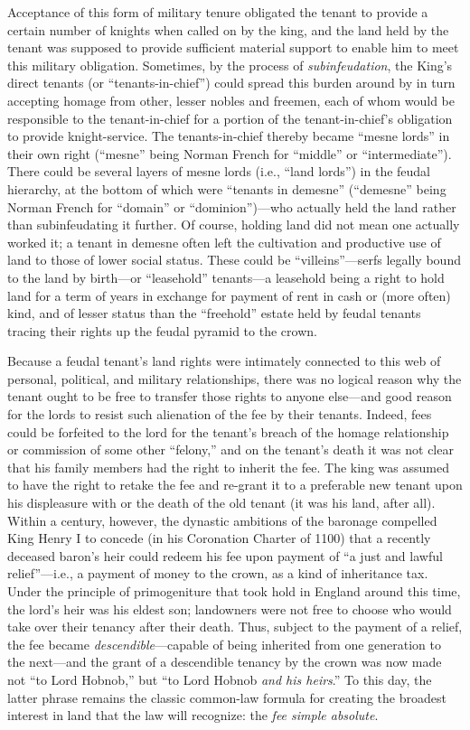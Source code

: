 Acceptance of this form of military tenure obligated the tenant to provide a
certain number of knights when called on by the king, and the land held by the
tenant was supposed to provide sufficient material support to enable him to
meet this military obligation. Sometimes, by the process of
\textit{subinfeudation}, the King's direct tenants (or ``tenants-in-chief'')
could spread this burden around by in turn accepting homage from other, lesser
nobles and freemen, each of whom would be responsible to the tenant-in-chief
for a portion of the tenant-in-chief's obligation to provide knight-service.
The tenants-in-chief thereby became ``mesne lords'' in their own right
(``mesne'' being Norman French for ``middle'' or ``intermediate''). There could
be several layers of mesne lords (i.e., ``land lords'') in the feudal
hierarchy, at the bottom of which were ``tenants in demesne'' (``demesne''
being Norman French for ``domain'' or ``dominion'')---who actually held the
land rather than subinfeudating it further. Of course, holding land did not
mean one actually worked it; a tenant in demesne often left the cultivation and
productive use of land to those of lower social status. These could be
``villeins''---serfs legally bound to the land by birth---or ``leasehold''
tenants---a leasehold being a right to hold land for a term of years in
exchange for payment of rent in cash or (more often) kind, and of lesser status
than the ``freehold'' estate held by feudal tenants tracing their rights up the
feudal pyramid to the crown.

Because a feudal tenant's land rights were intimately connected to this web of
personal, political, and military relationships, there was no logical reason
why the tenant ought to be free to transfer those rights to anyone else---and
good reason for the lords to resist such alienation of the fee by their
tenants. Indeed, fees could be forfeited to the lord for the tenant's breach of
the homage relationship or commission of some other ``felony,'' and on the
tenant's death it was not clear that his family members had the right to
inherit the fee. The king was assumed to have the right to retake the fee and
re-grant it to a preferable new tenant upon his displeasure with or the death
of the old tenant (it was his land, after all). Within a century, however, the
dynastic ambitions of the baronage compelled King Henry I to concede (in his
Coronation Charter of 1100) that a recently deceased baron's heir could redeem
his fee upon payment of ``a just and lawful relief''---i.e., a payment of money
to the crown, as a kind of inheritance tax. Under the principle of
primogeniture that took hold in England around this time, the lord's heir was
his eldest son; landowners were not free to choose who would take over their
tenancy after their death. Thus, subject to the payment of a relief, the fee
became \textit{descendible}---capable of being inherited from one generation
to the next---and the grant of a descendible tenancy by the crown was now made
not ``to Lord Hobnob,'' but ``to Lord Hobnob \textit{and his heirs}.'' To this
day, the latter phrase remains the classic common-law formula for creating the
broadest interest in land that the law will recognize: the \textit{fee simple
absolute}.

